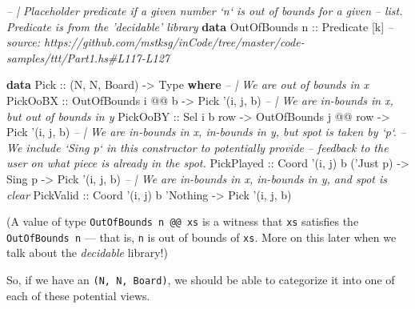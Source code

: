 \documentclass[]{article}
\newenvironment{Shaded}{}{}
\newcommand{\CommentTok}[1]{\textcolor[rgb]{0.38,0.63,0.69}{\textit{#1}}}
\newcommand{\DataTypeTok}[1]{\textcolor[rgb]{0.56,0.13,0.00}{#1}}
\newcommand{\FunctionTok}[1]{\textcolor[rgb]{0.02,0.16,0.49}{#1}}
\newcommand{\KeywordTok}[1]{\textcolor[rgb]{0.00,0.44,0.13}{\textbf{#1}}}
\newcommand{\NormalTok}[1]{#1}
\newcommand{\OtherTok}[1]{\textcolor[rgb]{0.00,0.44,0.13}{#1}}
\begin{document}
\begin{Shaded}
\begin{Highlighting}[]
\CommentTok{-- | Placeholder predicate if a given number `n` is out of bounds for a given}
\CommentTok{-- list.  Predicate is from the 'decidable' library}
\KeywordTok{data} \DataTypeTok{OutOfBounds}\OtherTok{ n ::} \DataTypeTok{Predicate}\NormalTok{ [k]}
\CommentTok{-- source: https://github.com/mstksg/inCode/tree/master/code-samples/ttt/Part1.hs#L117-L127}

\KeywordTok{data} \DataTypeTok{Pick}\OtherTok{ ::}\NormalTok{ (}\DataTypeTok{N}\NormalTok{, }\DataTypeTok{N}\NormalTok{, }\DataTypeTok{Board}\NormalTok{) }\OtherTok{->} \DataTypeTok{Type} \KeywordTok{where}
    \CommentTok{-- | We are out of bounds in x}
    \DataTypeTok{PickOoBX}\OtherTok{   ::} \DataTypeTok{OutOfBounds}\NormalTok{ i }\FunctionTok{@@}\NormalTok{ b                         }\OtherTok{->} \DataTypeTok{Pick}\NormalTok{ '(i, j, b)}
    \CommentTok{-- | We are in-bounds in x, but out of bounds in y}
    \DataTypeTok{PickOoBY}\OtherTok{   ::} \DataTypeTok{Sel}\NormalTok{ i b row        }\OtherTok{->} \DataTypeTok{OutOfBounds}\NormalTok{ j }\FunctionTok{@@}\NormalTok{ row }\OtherTok{->} \DataTypeTok{Pick}\NormalTok{ '(i, j, b)}
    \CommentTok{-- | We are in-bounds in x, in-bounds in y, but spot is taken by `p`.}
    \CommentTok{-- We include `Sing p` in this constructor to potentially provide}
    \CommentTok{-- feedback to the user on what piece is already in the spot.}
    \DataTypeTok{PickPlayed}\OtherTok{ ::} \DataTypeTok{Coord}\NormalTok{ '(i, j) b ('}\DataTypeTok{Just}\NormalTok{ p) }\OtherTok{->} \DataTypeTok{Sing}\NormalTok{ p        }\OtherTok{->} \DataTypeTok{Pick}\NormalTok{ '(i, j, b)}
    \CommentTok{-- | We are in-bounds in x, in-bounds in y, and spot is clear}
    \DataTypeTok{PickValid}\OtherTok{  ::} \DataTypeTok{Coord}\NormalTok{ '(i, j) b '}\DataTypeTok{Nothing}                   \OtherTok{->} \DataTypeTok{Pick}\NormalTok{ '(i, j, b)}
\end{Highlighting}
\end{Shaded}

(A value of type \texttt{OutOfBounds\ n\ @@\ xs} is a witness that \texttt{xs}
satisfies the \texttt{OutOfBounds\ n} --- that is, \texttt{n} is out of bounds
of \texttt{xs}. More on this later when we talk about the \emph{decidable}
library!)

So, if we have an \texttt{(N,\ N,\ Board)}, we should be able to categorize it
into one of each of these potential views.
\end{document}

